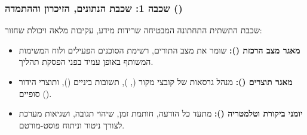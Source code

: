 \subsubsection{שכבה 1: שכבת הנתונים, הזיכרון וההתמדה ()}
שכבת התשתית התחתונה המבטיחה שרידות מידע, עקיבות מלאה ויכולת שחזור:
\begin{itemize}[leftmargin=1.2cm]
  \item \textbf{מאגר מצב הרכזת ():} שומר את מצב התורים, רשימת הסוכנים הפעילים ולוח המשימות המשותף באופן עמיד בפני הפסקת תהליך.
  \item \textbf{מאגר תוצרים ():} מנהל גרסאות של קובצי מקור (, ), תשובות ביניים (), ותוצרי הידור סופיים ().
  \item \textbf{יומני ביקורת וטלמטריה ():} מתעד כל הודעה, חותמת זמן, שיהוי תגובה, ושגיאות מערכת לצורך ניטור וניתוח פוסט-מורטם.
\end{itemize}

